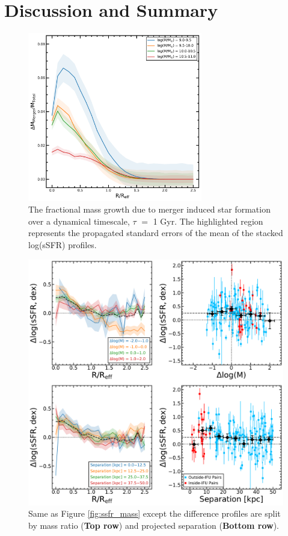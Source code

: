 \documentclass[iop,revtex4,twocolumn,apj,numberedappendix,appendixfloats]{emulateapj}
\begin{document}
\section{Discussion and Summary}\label{sec:sum}
\begin{figure}
\centering
\includegraphics[width=3in]{fig/mass_gain.pdf}
\caption[The fractional mass gain due to merger induced star formation.]{The fractional mass growth due to merger induced star formation over a dynamical timescale, $\tau$ $=$ 1 Gyr. The highlighted region represents the propagated standard errors of the mean of the stacked log(sSFR) profiles. }
\label{fig:mass_gain_sum}
\end{figure}

\begin{figure}
\centering
\includegraphics[width=\linewidth]{fig/ssfr_partial.pdf}
\caption[]{Same as Figure \ref{fig:ssfr_mass} except the difference profiles are split by mass ratio (\textbf{Top row}) and projected separation (\textbf{Bottom row}). }
\label{fig:ssfr_dmsep}
\end{figure}
\end{document}
